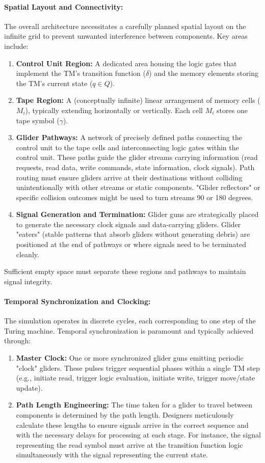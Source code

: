 \documentclass{article}
\theoremstyle{definition}
\theoremstyle{plain}
\theoremstyle{plain}
\begin{document}
\paragraph{Spatial Layout and Connectivity:}
The overall architecture necessitates a carefully planned spatial layout on the infinite grid to prevent unwanted interference between components. Key areas include:
\begin{enumerate}
  \item \textbf{Control Unit Region:} A dedicated area housing the logic gates that implement the TM's transition function ($\delta$) and the memory elements storing the TM's current state ($q \in Q$).
  \item \textbf{Tape Region:} A (conceptually infinite) linear arrangement of memory cells ($M_i$), typically extending horizontally or vertically. Each cell $M_i$ stores one tape symbol ($\gamma$).
  \item \textbf{Glider Pathways:} A network of precisely defined paths connecting the control unit to the tape cells and interconnecting logic gates within the control unit. These paths guide the glider streams carrying information (read requests, read data, write commands, state information, clock signals). Path routing must ensure gliders arrive at their destinations without colliding unintentionally with other streams or static components. "Glider reflectors" or specific collision outcomes might be used to turn streams 90 or 180 degrees.
  \item \textbf{Signal Generation and Termination:} Glider guns are strategically placed to generate the necessary clock signals and data-carrying gliders. Glider "eaters" (stable patterns that absorb gliders without generating debris) are positioned at the end of pathways or where signals need to be terminated cleanly.
\end{enumerate}
Sufficient empty space must separate these regions and pathways to maintain signal integrity.

\paragraph{Temporal Synchronization and Clocking:}
The simulation operates in discrete cycles, each corresponding to one step of the Turing machine. Temporal synchronization is paramount and typically achieved through:
\begin{enumerate}
  \item \textbf{Master Clock:} One or more synchronized glider guns emitting periodic "clock" gliders. These pulses trigger sequential phases within a single TM step (e.g., initiate read, trigger logic evaluation, initiate write, trigger move/state update).
  \item \textbf{Path Length Engineering:} The time taken for a glider to travel between components is determined by the path length. Designers meticulously calculate these lengths to ensure signals arrive in the correct sequence and with the necessary delays for processing at each stage. For instance, the signal representing the read symbol must arrive at the transition function logic simultaneously with the signal representing the current state.
\end{enumerate}
\end{document}
